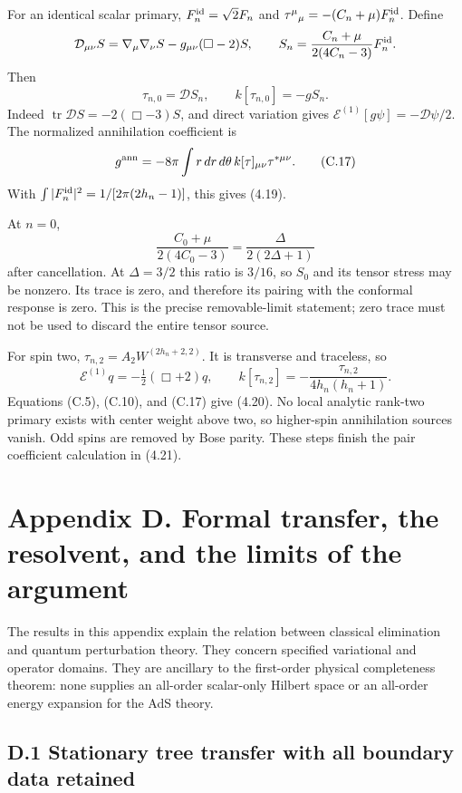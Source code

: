 For an identical scalar primary, \(F_n^{\rm id}=\sqrt2F_n\) and \(\tau^\mu{}_\mu=-(C_n+\mu)F_n^{\rm id}\). Define \[
\mathcal D_{\mu\nu}S
=\nabla_\mu\nabla_\nu S-g_{\mu\nu}(\Box-2)S,
\qquad
S_n=\frac{C_n+\mu}{2(4C_n-3)}F_n^{\rm id}.
\] Then \[
\tau_{n,0}=\mathcal DS_n,\qquad
k[\tau_{n,0}]=-gS_n .
\tag{C.16}
\] Indeed \(\operatorname{tr}\mathcal DS=-2(\Box-3)S\), and direct variation gives \(\mathcal E^{(1)}[g\psi]=-\mathcal D\psi/2\). The normalized annihilation coefficient is \[
g^{\rm ann}=-8\pi\int r\,dr\,d\theta\,
k[\tau]_{\mu\nu}\tau^{*\mu\nu}.
\tag{C.17}
\] With \(\int|F_n^{\rm id}|^2=1/[2\pi(2h_n-1)]\), this gives (4.19).

At \(n=0\), \[
\frac{C_0+\mu}{2(4C_0-3)}
=\frac{\Delta}{2(2\Delta+1)}
\] after cancellation. At \(\Delta=3/2\) this ratio is \(3/16\), so \(S_0\) and its tensor stress may be nonzero. Its trace is zero, and therefore its pairing with the conformal response is zero. This is the precise removable-limit statement; zero trace must not be used to discard the entire tensor source.

For spin two, \(\tau_{n,2}=A_2W^{(2h_n+2,2)}\). It is transverse and traceless, so \[
\mathcal E^{(1)}q=-\tfrac12(\Box+2)q,\qquad
k[\tau_{n,2}]=-\frac{\tau_{n,2}}{4h_n(h_n+1)} .
\tag{C.18}
\] Equations (C.5), (C.10), and (C.17) give (4.20). No local analytic rank-two primary exists with center weight above two, so higher-spin annihilation sources vanish. Odd spins are removed by Bose parity. These steps finish the pair coefficient calculation in (4.21).

\clearpage
\hypertarget{appendix-d.-formal-transfer-the-resolvent-and-the-limits-of-the-argument}{%
\section{Appendix D. Formal transfer, the resolvent, and the limits of the argument}\label{appendix-d.-formal-transfer-the-resolvent-and-the-limits-of-the-argument}}

The results in this appendix explain the relation between classical elimination and quantum perturbation theory. They concern specified variational and operator domains. They are ancillary to the first-order physical completeness theorem: none supplies an all-order scalar-only Hilbert space or an all-order energy expansion for the AdS theory.

\hypertarget{d.1-stationary-tree-transfer-with-all-boundary-data-retained}{%
\subsection{D.1 Stationary tree transfer with all boundary data retained}\label{d.1-stationary-tree-transfer-with-all-boundary-data-retained}}

